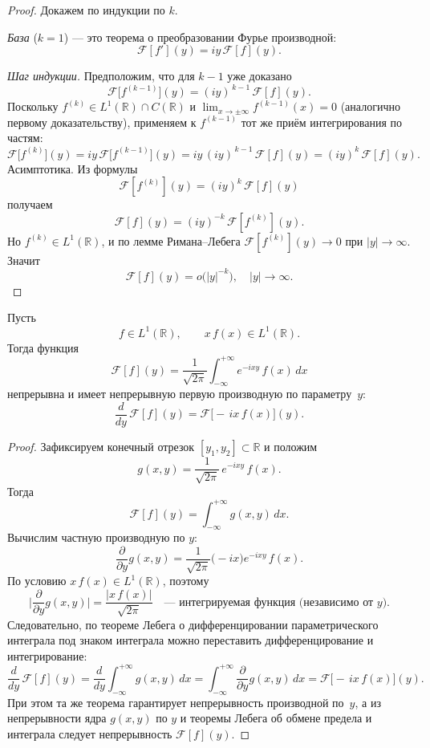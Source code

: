\begin{proof}
    Докажем по индукции по $k$.

    \textit{База} ($k=1$) — это теорема о преобразовании Фурье производной:
    \[
        \mathcal F[f'](y)
        =iy\,\mathcal F[f](y).
    \]

    \textit{Шаг индукции.} Предположим, что для $k-1$ уже доказано
    \[
        \mathcal F\bigl[f^{(k-1)}\bigr](y)
        =(iy)^{\,k-1}\,\mathcal F[f](y).
    \]
    Поскольку $f^{(k)}\in L^1(\mathbb R)\cap C(\mathbb R)$ и $\lim_{x\to\pm\infty}f^{(k-1)}(x)=0$
    (аналогично первому доказательству), применяем к $f^{(k-1)}$ тот же приём интегрирования по частям:
    \[
        \mathcal F\bigl[f^{(k)}\bigr](y)
        =iy\,\mathcal F\bigl[f^{(k-1)}\bigr](y)
        =iy\,(iy)^{\,k-1}\,\mathcal F[f](y)
        =(iy)^k\,\mathcal F[f](y).
    \]
    Асимптотика. Из формулы
    \[
        \mathcal F[f^{(k)}](y)
        =(iy)^k\,\mathcal F[f](y)
    \]
    получаем
    \[
        \mathcal F[f](y)
        =(iy)^{-k}\,\mathcal F[f^{(k)}](y).
    \]
    Но $f^{(k)}\in L^1(\mathbb R)$, и по лемме Римана–Лебега
    $\mathcal F[f^{(k)}](y)\to0$ при $|y|\to\infty$. Значит
    \[
        \mathcal F[f](y)
        =o\bigl(|y|^{-k}\bigr),
        \quad |y|\to\infty.
    \]
\end{proof}


\begin{theorem}
    Пусть
    \[
        f\in L^1(\mathbb R),
        \qquad
        x\,f(x)\in L^1(\mathbb R).
    \]
    Тогда функция
    \[
        \mathcal F[f](y)
        =\frac1{\sqrt{2\pi}}\int_{-\infty}^{+\infty}e^{-i x y}\,f(x)\,dx
    \]
    непрерывна и имеет непрерывную первую производную по параметру~$y$:
    \[
        \frac{d}{dy}\,\mathcal F[f](y)
        =\mathcal F\bigl[-\,i x\,f(x)\bigr](y).
    \]
\end{theorem}

\begin{proof}
    Зафиксируем конечный отрезок $[y_1,y_2]\subset\mathbb R$ и положим
    \[
        g(x,y)
        =\frac1{\sqrt{2\pi}}\,e^{-i x y}\,f(x).
    \]
    Тогда
    \[
        \mathcal F[f](y)=\int_{-\infty}^{+\infty}g(x,y)\,dx.
    \]
    Вычислим частную производную по $y$:
    \[
        \frac{\partial}{\partial y}g(x,y)
        =\frac1{\sqrt{2\pi}}\bigl(-i x\bigr)e^{-i x y}\,f(x).
    \]
    По условию $x\,f(x)\in L^1(\mathbb R)$, поэтому
    \[
        \biggl|\frac{\partial}{\partial y}g(x,y)\biggr|
        =\frac{|x\,f(x)|}{\sqrt{2\pi}}
        \quad\text{— интегрируемая функция (независимо от $y$).}
    \]
    Следовательно, по теореме Лебега о дифференцировании параметрического
    интеграла под знаком интеграла можно переставить дифференцирование и
    интегрирование:
    \[
        \frac{d}{dy}\,\mathcal F[f](y)
        =\frac{d}{dy}\int_{-\infty}^{+\infty}g(x,y)\,dx
        =\int_{-\infty}^{+\infty}\frac{\partial}{\partial y}g(x,y)\,dx
        =\mathcal F\bigl[-\,i x\,f(x)\bigr](y).
    \]
    При этом та же теорема гарантирует непрерывность производной по~$y$,
    а из непрерывности ядра $g(x,y)$ по $y$ и теоремы Лебега об обмене
    предела и интеграла следует непрерывность $\mathcal F[f](y)$.
\end{proof}

